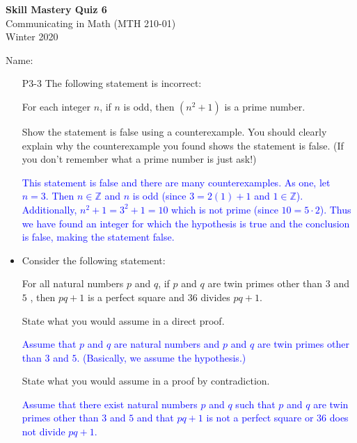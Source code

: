 \documentclass[10pt]{article}
\newcommand{\Z}{\mathbb{Z}}
\newcommand{\bs}{\begin{solution}}
\begin{document}
\vspace{-1.2in}
\begin{center} \textbf{\Large{Skill Mastery Quiz 6}} \\
Communicating in Math (MTH 210-01)\\
Winter 2020
\end{center}



\noindent Name: 




\begin{itemize}
	


\item[P3-3]  The following statement is incorrect:
		\begin{center}
For each integer $n$, if $n$ is odd, then $(n^2+1)$ is a prime number.	
	\end{center}
			Show the statement is false using a counterexample. You should clearly explain why the counterexample you found shows the statement is false. (If you don't remember what a prime number is just ask!)


\bs \textcolor{blue}{This statement is false and there are many counterexamples. As one, let $n=3$. Then $n\in\Z$ and $n$ is odd (since $3=2(1)+1$ and $1\in\Z$). Additionally, $n^2+1=3^2+1 = 10$ which is not prime (since $10=5\cdot 2$). Thus we have found an integer for which the hypothesis is true and the conclusion is false, making the statement false.}\end{solution}
\vfill



\item[P1-2] Consider the following statement:
		\begin{center}
		For all natural numbers $p$ and $q$, if $p$ and $q$ are twin primes other than $3$ and $5$ , then $pq+1$ is a perfect square and $36$ divides $pq+1$.
		\end{center}
	State what you would assume in a direct proof. 
	
	\bs\textcolor{blue}{Assume that $p$ and $q$ are natural numbers and $p$ and $q$ are twin primes other than $3$ and $5$. (Basically, we assume the hypothesis.)}\end{solution}
	
	\vfill
	
	
	State what you would assume in a proof by contradiction.
	
	\bs\textcolor{blue}{Assume that there exist natural numbers $p$ and $q$ such that $p$ and $q$ are twin primes other than $3$ and $5$ and that $pq+1$ is not a perfect square or $36$ does not divide $pq+1$. }\end{solution}
\vfill


\end{itemize}
\end{document}
